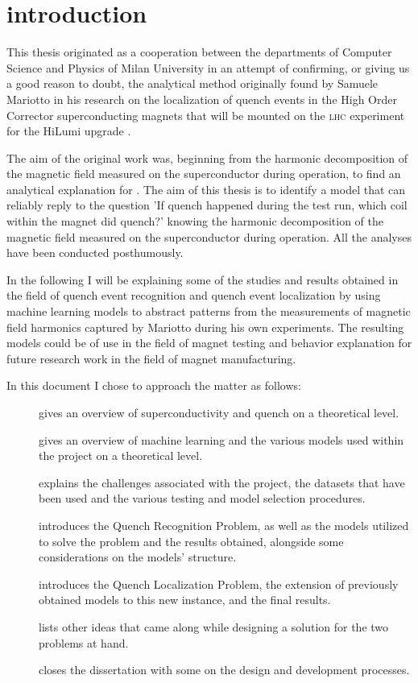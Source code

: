 \chapter{introduction}
This thesis originated as a cooperation between the departments of Computer Science and Physics of
Milan University in an attempt of confirming, or giving us a good reason to doubt, the analytical
method originally found by Samuele Mariotto in his research on the localization of quench events in
the High Order Corrector superconducting magnets that will be mounted on the \textsc{lhc} experiment for the
HiLumi upgrade \cite{mariotto2022} \cite{mariotto2022-generic}.

\smallskip

The aim of the original work was, beginning from the harmonic decomposition of the magnetic
field measured on the superconductor during operation, to find an analytical explanation for \qlp.
The aim of this thesis is to identify a model that can reliably reply to the question 'If quench
happened during the test run, which coil within the magnet did quench?' knowing the harmonic
decomposition of the magnetic field measured on the superconductor during operation. All the
analyses have been conducted posthumously.

\smallskip

In the following I will be explaining some of the studies and results obtained in the field of
quench event recognition and quench event localization by using machine learning models to abstract
patterns from the measurements of magnetic field harmonics captured by Mariotto during his own
experiments. The resulting models could be of use in the field of magnet testing and behavior
explanation for future research work in the field of magnet manufacturing.

\smallskip

In this document I chose to approach the matter as follows:
\begin{description}
	\item[] gives an overview of superconductivity and quench on a
		theoretical level.
	\item[] gives an overview of machine learning and the various models used
		within the project on a theoretical level.
	\item[] explains the challenges associated with the project, the datasets
		that have been used and the various testing and model selection procedures.
	\item[] introduces the Quench Recognition Problem, as well as the models
		utilized to solve the problem and the results obtained, alongside some
		considerations on the models' structure.
	\item[] introduces the Quench Localization Problem, the extension of previously
		obtained models to this new instance, and the final results.
	\item[] lists other ideas that came along while designing a solution for
		the two problems at hand.
	\item[] closes the dissertation with some on the design and development
		processes.
\end{description}
